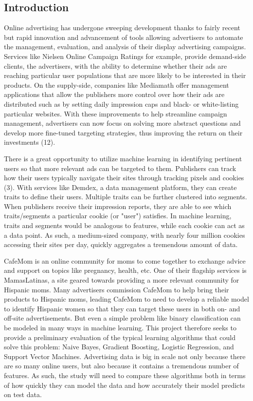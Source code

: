 \documentclass[a4paper]{article}
\begin{document}
\begin{multicols}{2}

\section*{Introduction}

Online advertising has undergone sweeping development thanks to fairly recent but rapid innovation and advancement of tools allowing advertisers to automate the management, evaluation, and analysis of their display advertising campaigns. Services like Nielsen Online Campaign Ratings for example, provide demand-side clients, the advertisers, with the ability to determine whether their ads are reaching particular user populations that are more likely to be interested in their products. On the supply-side, companies like Mediamath offer management applications that allow the publishers more control over how their ads are distributed such as by setting daily impression caps and black- or white-listing particular websites. With these improvements to help streamline campaign management, advertisers can now focus on solving more abstract questions and develop more fine-tuned targeting strategies, thus improving the return on their investments (12).

There is a great opportunity to utilize machine learning in identifying pertinent users so that more relevant ads can be targeted to them. Publishers can track how their users typically navigate their sites through tracking pixels and cookies (3). With services like Demdex, a data management platform, they can create traits to define their users. Multiple traits can be further clustered into segments. When publishers receive their impression reports, they are able to see which traits/segments a particular cookie (or "user") satisfies. In machine learning, traits and segments would be analogous to features, while each cookie can act as a data point. As such, a medium-sized company, with nearly four million cookies accessing their sites per day, quickly aggregates a tremendous amount of data.

CafeMom is an online community for moms to come together to exchange advice and support on topics like pregnancy, health, etc. One of their flagship services is MamasLatinas, a site geared towards providing a more relevant community for Hispanic moms. Many advertisers commission CafeMom to help bring their products to Hispanic moms, leading CafeMom to need to develop a reliable model to identify Hispanic women so that they can target these users in both on- and off-site advertisements. But even a simple problem like binary classification can be modeled in many ways in machine learning. This project therefore seeks to provide a preliminary evaluation of the typical learning algorithms that could solve this problem: Naive Bayes, Gradient Boosting, Logistic Regression, and Support Vector Machines. Advertising data is big in scale not only because there are so many online users, but also because it contains a tremendous number of features. As such, the study will need to compare these algorithms both in terms of how quickly they can model the data and how accurately their model predicts on test data.


\end{multicols}
\end{document}
